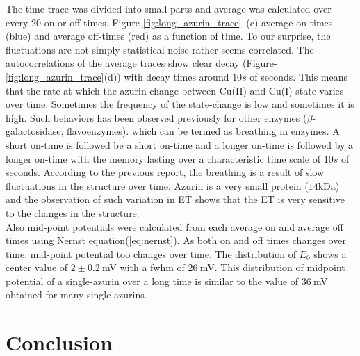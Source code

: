 \documentclass[journal=jacsat,manuscript=article]{achemso}
\begin{document}
The time trace was divided into small parts and average was calculated over every $20$ on or off times. Figure-\ref{fig:long_azurin_trace}~(c) average on-times (blue) and average off-times (red) as a function of time. To our surprise, the fluctuations are not simply statistical noise rather seems correlated. The autocorrelations of the average traces show clear decay (Figure-\ref{fig:long_azurin_trace}(d)) with decay times around $10s$ of seconds. This means that the rate at which the azurin change between Cu(II) and Cu(I) state varies over time. Sometimes the frequency of the state-change is low and sometimes it is high. Such behaviors has been observed previously for other enzymes ($\beta$-galactosidase, flavoenzymes).\cite{lu1998single-molecule,kou2005single-molecule,english2006ever-fluctuating} which can be termed as breathing in enzymes. A short on-time is followed be a short on-time and a longer on-time is followed by a longer on-time with the memory lasting over a characteristic time scale of $10s$ of seconds. According to the previous report, the breathing is a result of slow fluctuations in the structure over time. Azurin is a very small protein ($14$kDa) and the observation of such variation in ET shows that the ET is very sensitive to the changes in the structure.\\

Also mid-point potentials were calculated from each average on and average off times using Nernst equation(\ref{eq:nernst}). As both on and off times changes over time, mid-point potential too changes over time. The distribution of $E_0$ shows a center value of $2\pm0.2~$mV with a fwhm of $26~$mV. This distribution of midpoint potential of a single-azurin over a long time is similar to the value of $36~$mV obtained for many single-azurins.
\section{Conclusion}
% 
\pagebreak

\end{document}
